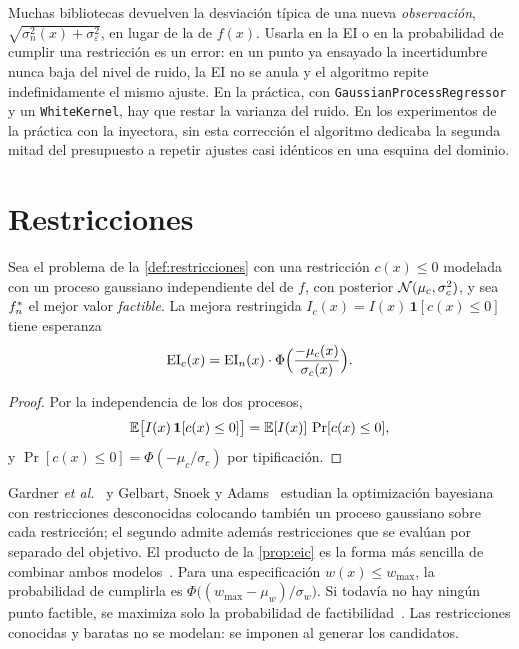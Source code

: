 \begin{observacion}\label{obs:latente}
Muchas bibliotecas devuelven la desviación típica de una nueva \emph{observación}, $\sqrt{\sigma_n^2(x)+\sigma_\varepsilon^2}$, en lugar de la de $f(x)$. Usarla en la EI o en la probabilidad de cumplir una restricción es un error: en un punto ya ensayado la incertidumbre nunca baja del nivel de ruido, la EI no se anula y el algoritmo repite indefinidamente el mismo ajuste. En la práctica, con \texttt{GaussianProcessRegressor} y un \texttt{WhiteKernel}, hay que restar la varianza del ruido. En los experimentos de la práctica con la inyectora, sin esta corrección el algoritmo dedicaba la segunda mitad del presupuesto a repetir ajustes casi idénticos en una esquina del dominio.
\end{observacion}

\section{Restricciones}

\begin{proposicion}\label{prop:eic}
Sea el problema de la \cref{def:restricciones} con una restricción $c(x)\le 0$ modelada con un proceso gaussiano independiente del de $f$, con posterior $\mathcal{N}(\mu_c,\sigma_c^2)$, y sea $f^{*}_{n}$ el mejor valor \emph{factible}. La mejora restringida $I_c(x)=I(x)\,\mathbf 1[c(x)\le 0]$ tiene esperanza
\[
\operatorname{EI}_c(x)=\operatorname{EI}_n(x)\cdot\Phi\Bigl(\frac{-\mu_c(x)}{\sigma_c(x)}\Bigr).
\]
\end{proposicion}

\begin{proof}
Por la independencia de los dos procesos,\[\mathbb{E}\bigl[I(x)\,\mathbf 1[c(x)\le0]\bigr]=\mathbb{E}[I(x)]\,\Pr[c(x)\le 0],\]y $\Pr[c(x)\le0]=\Phi(-\mu_c/\sigma_c)$ por tipificación.
\end{proof}

Gardner \emph{et al.}~\cite{gardner} y Gelbart, Snoek y Adams~\cite{gelbart} estudian la optimización bayesiana con restricciones desconocidas colocando también un proceso gaussiano sobre cada restricción; el segundo admite además restricciones que se evalúan por separado del objetivo. El producto de la \cref{prop:eic} es la forma más sencilla de combinar ambos modelos~\cite[§11.2]{garnett}. Para una especificación $w(x)\le w_{\max}$, la probabilidad de cumplirla es $\Phi\bigl((w_{\max}-\mu_w)/\sigma_w\bigr)$. Si todavía no hay ningún punto factible, se maximiza solo la probabilidad de factibilidad~\cite[§11.2]{garnett}. Las restricciones conocidas y baratas no se modelan: se imponen al generar los candidatos.

